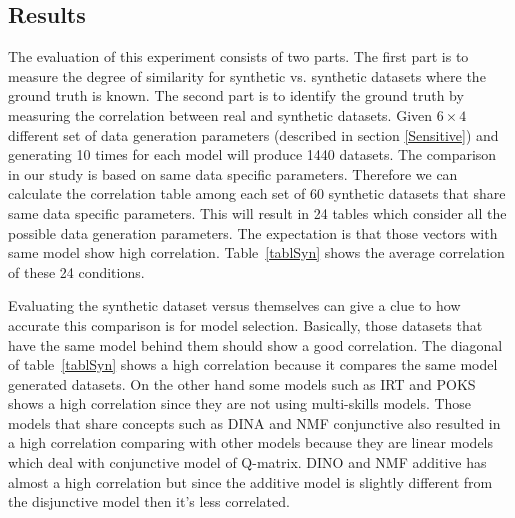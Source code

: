 


\subsection{Results}


The evaluation of this experiment consists of two parts. The first part is to measure the degree of similarity for synthetic vs. synthetic datasets where the ground truth is known. The second part is to identify the ground truth by measuring the correlation between real and synthetic datasets. 
Given $6\times 4$ different set of data generation parameters (described in section \ref{Sensitive}) and generating 10 times for each model will produce 1440 datasets. The comparison in our study is based on same data specific parameters. Therefore we can calculate the correlation table among each set of 60 synthetic datasets that share same data specific parameters. This will result in 24 tables which consider all the possible data generation parameters. The expectation is that those vectors with same model show high correlation. Table~\ref{tablSyn} shows the average correlation of these 24  conditions.

Evaluating the synthetic dataset versus themselves can give a clue to how accurate this comparison is for model selection. Basically, those datasets that have the same model behind them should show a good correlation. The diagonal of table~\ref{tablSyn} shows a high correlation because it compares the same model generated datasets. On the other hand some models such as IRT and POKS shows a high correlation since they are not using multi-skills models. Those models that share concepts such as DINA and NMF conjunctive also resulted in a high correlation comparing with other models because they are linear models which deal with conjunctive model of Q-matrix. DINO and NMF additive has almost a high correlation but since the additive model is slightly different from the disjunctive model then it's less correlated.


